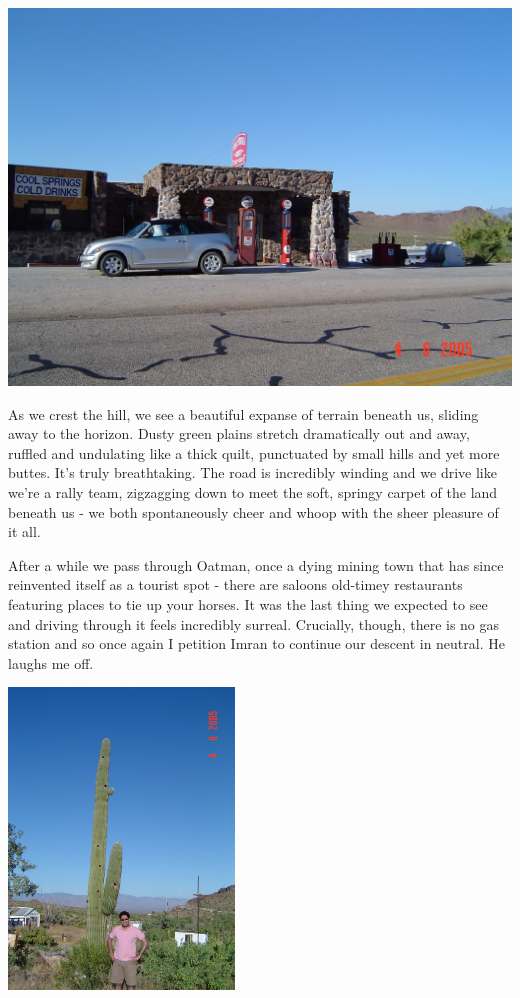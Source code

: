 \documentclass[a5paper,titlepage,11pt]{book}
\begin{document}
\begin{center}\includegraphics[width=\textwidth]{gfx/DSC00700}\end{center}

As we crest the hill, we see a beautiful expanse of terrain beneath us, sliding away to the horizon.  Dusty green plains stretch dramatically out and away, ruffled and undulating like a thick quilt, punctuated by small hills and yet more buttes.  It's truly breathtaking.  The road is incredibly winding and we drive like we're a rally team, zigzagging down to meet the soft, springy carpet of the land beneath us - we both spontaneously cheer and whoop with the sheer pleasure of it all.

After a while we pass through Oatman, once a dying mining town that has since reinvented itself as a tourist spot - there are saloons old-timey restaurants featuring places to tie up your horses.  It was the last thing we expected to see and driving through it feels incredibly surreal.  Crucially, though, there is no gas station and so once again I petition Imran to continue our descent in neutral.  He laughs me off.

\begin{center}\includegraphics[height=80mm]{gfx/DSC00701}\end{center}
\end{document}
